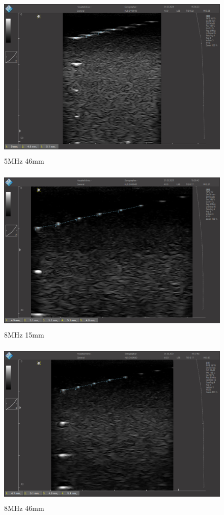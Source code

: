 \documentclass[11pt]{scrartcl}
\begin{document}
    \begin{figure}[H]
        \centering
        \includegraphics[height=8cm]{images/D_5_46_e}
        \caption{5MHz 46mm}
        \label{fig:D_5_46}
    \end{figure}

    \begin{figure}[H]
        \centering
        \includegraphics[height=8cm]{images/D_8_15_e}
        \caption{8MHz 15mm}
        \label{fig:D_8_15}
    \end{figure}

    \begin{figure}[H]
        \centering
        \includegraphics[height=8cm]{images/D_8_46_e}
        \caption{8MHz 46mm}
        \label{fig:D_8_46}
    \end{figure}
\end{document}
